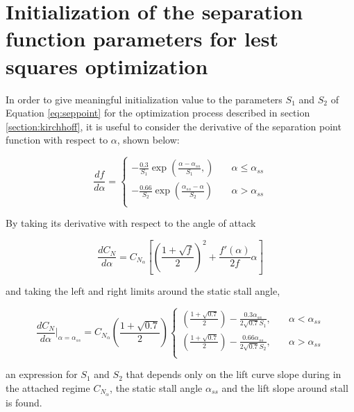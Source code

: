 \section{Initialization of the separation function parameters for lest squares optimization}

In order to give meaningful initialization value to the parameters $S_1$ and $S_2$ of Equation \eqref{eq:seppoint} for the optimization process described in section \ref{section:kirchhoff}, it is useful to consider the derivative of the separation point function with respect to $\alpha$, shown below:

\begin{equation} 
\frac{df}{d\alpha} = 
     \begin{cases}
       -\frac{0.3}{S_1}\exp(\frac{\alpha-\alpha_{ss}}{S_1},) &\quad \alpha \leq \alpha_{ss}\\
        -\frac{0.66}{S_2}\exp(\frac{\alpha_{ss}-\alpha}{S_2}) &\quad \alpha > \alpha_{ss}\\
     \end{cases}
\end{equation}

By taking its derivative with respect to the angle of attack

\begin{equation}
\frac{dC_N}{d\alpha} = C_{N_{\alpha}} \left[\left(\frac{1+\sqrt{f}}{2}\right)^2+\frac{f'(\alpha)}{2f}\alpha \right]
\end{equation}

\noindent and taking the left and right limits around the static stall angle,

\begin{equation}
\frac{dC_N}{d\alpha}|_{\alpha=\alpha_{ss}} = C_{N_\alpha}\left(\frac{1+\sqrt{0.7}}{2}\right)
     \begin{cases}
      \left(\frac{1+\sqrt{0.7}}{2}\right)-\frac{0.3\alpha_{ss}}{2\sqrt{0.7}S_1},&\quad \alpha < \alpha_{ss}\\
        \left(\frac{1+\sqrt{0.7}}{2}\right)-\frac{0.66\alpha_{ss}}{2\sqrt{0.7}S_2}, &\quad \alpha > \alpha_{ss}\\
     \end{cases}
\end{equation}

\noindent an expression for $S_1$ and $S_2$ that depends only on the lift curve slope during in the attached regime $C_{N_\alpha}$, the static stall angle $\alpha_{ss}$ and the lift slope around stall is found.

